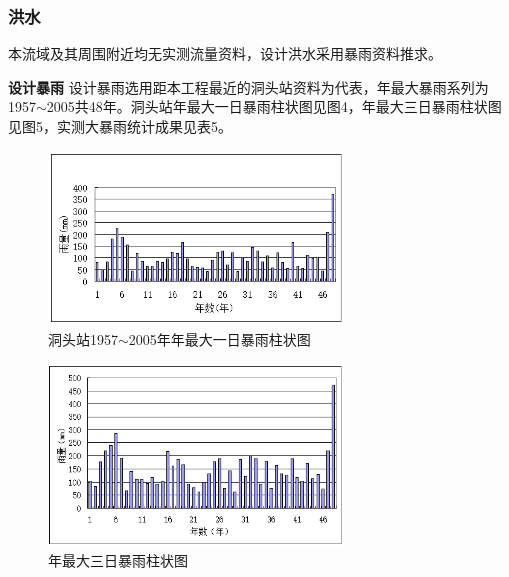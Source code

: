 \documentclass[UTF8, a4paper, 12pt]{ctexart} %
\begin{document}
\subsubsection{洪水}
本流域及其周围附近均无实测流量资料，设计洪水采用暴雨资料推求。
\par
\textbf{设计暴雨}
设计暴雨选用距本工程最近的洞头站资料为代表，年最大暴雨系列为1957$\sim$2005共48年。洞头站年最大一日暴雨柱状图见图4，年最大三日暴雨柱状图见图5，实测大暴雨统计成果见表5。

\begin{figure}[h]
    \centering
    \includegraphics[width=0.7\textwidth]{4.png}
    \caption{洞头站1957$\sim$2005年年最大一日暴雨柱状图}
    \label{fig:annual_max_daily_rainfall}
\end{figure}
\begin{figure}[h]
    \centering
    \includegraphics[width=0.7\textwidth]{5.png}
    \caption{年最大三日暴雨柱状图}
    \label{fig:annual_max_three_day_rainfall}
\end{figure}
\newpage
\end{document}
